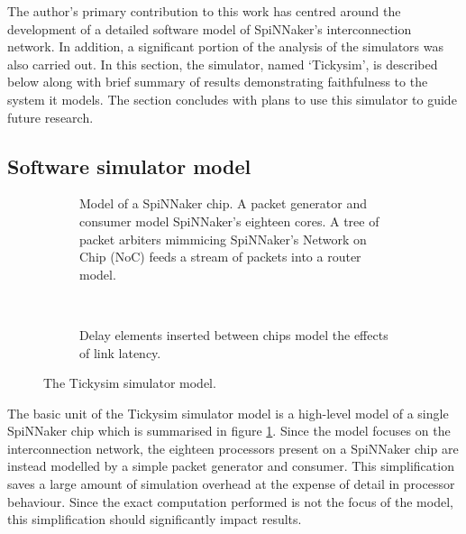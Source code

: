 		The author's primary contribution to this work has centred around the
		development of a detailed software model of SpiNNaker's interconnection
		network. In addition, a significant portion of the analysis of the
		simulators was also carried out. In this section, the simulator, named
		`Tickysim', is described below along with brief summary of results
		demonstrating faithfulness to the system it models. The section concludes
		with plans to use this simulator to guide future research.
		
		\subsection{Software simulator model}
			
			
			\begin{figure}
				\begin{subfigure}[b]{0.65\textwidth}
					\center
					\tikzexternaldisable
					
					\caption{Model of a SpiNNaker chip. A packet generator and consumer
					model SpiNNaker's eighteen cores. A tree of packet arbiters mimmicing
					SpiNNaker's Network on Chip (NoC) feeds a stream of packets into a
					router model.}
					\label{fig:tickysim-model-chip}
				\end{subfigure}
				~~~~~
				\begin{subfigure}[b]{0.28\textwidth}
					\centering
					
					\vspace{1.8cm}
					
					\caption{Delay elements inserted between chips model the effects of
					link latency.}
					\label{fig:tickysim-model-link-delays}
				\end{subfigure}
				
				\caption{The Tickysim simulator model.}
				\label{fig:tickysim-model}
			\end{figure}
			
			The basic unit of the Tickysim simulator model is a high-level model of a
			single SpiNNaker chip which is summarised in figure
			\ref{fig:tickysim-model-chip}. Since the model focuses on the
			interconnection network, the eighteen processors present on a SpiNNaker
			chip are instead modelled by a simple packet generator and consumer. This
			simplification saves a large amount of simulation overhead at the expense
			of detail in processor behaviour. Since the exact computation performed is
			not the focus of the model, this simplification should significantly
			impact results.
			
